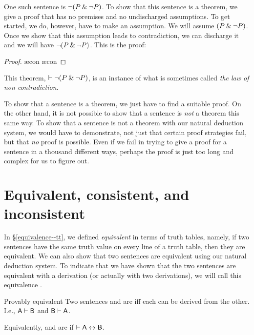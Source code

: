 One such sentence is ${\neg} (P \mathbin{\&} {\neg} P)$. To show that this sentence is a theorem, we give a proof that has no premises and no undischarged assumptions. To get started, we do, however, have to make an assumption. We will assume $(P \mathbin{\&} {\neg} P)$. Once we show that this assumption leads to contradiction, we can discharge it and we will have ${\neg} (P \mathbin{\&} {\neg} P)$. This is the proof:
	\begin{proof}
		\open
			 \as{}
			\ae{con}
			\ae{con}
		\close
	\end{proof}
This theorem, $\vdash {\neg} (P \mathbin{\&} {\neg} P)$, is an instance of what is sometimes called \emph{the law of non-contradiction}.

To show that a sentence is a theorem, we just have to find a suitable proof. On the other hand, it is not possible to show that a sentence is \emph{not} a theorem this same way. To show that a sentence is not a theorem with our natural deduction system, we would have to demonstrate, not just that certain proof strategies fail, but that \emph{no} proof is possible. Even if we fail in trying to give a proof for a sentence in a thousand different ways, perhaps the proof is just too long and complex for us to figure out. 


\section{Equivalent, consistent, and inconsistent}

In \S\ref{equivalence--tt}, we defined \textit{equivalent} in terms of truth tables, namely, if two sentences have the same truth value on every line of a truth table, then they are equivalent. We can also show that two sentences are equivalent using our natural deduction system. To indicate that we have shown that the two sentences are equivalent with a derivation (or actually with two derivations), we will call this equivalence . 

\begin{factboxy}{Provably equivalent}
Two sentences  and  are  iff each can be derived from the other. I.e., $\mathsf{A}\vdash\mathsf{B}$ and $\mathsf{B}\vdash\mathsf{A}$.\medskip

Equivalently,  and  are  if $\vdash \mathsf{A} \leftrightarrow \mathsf{B}$.
\end{factboxy}
        
